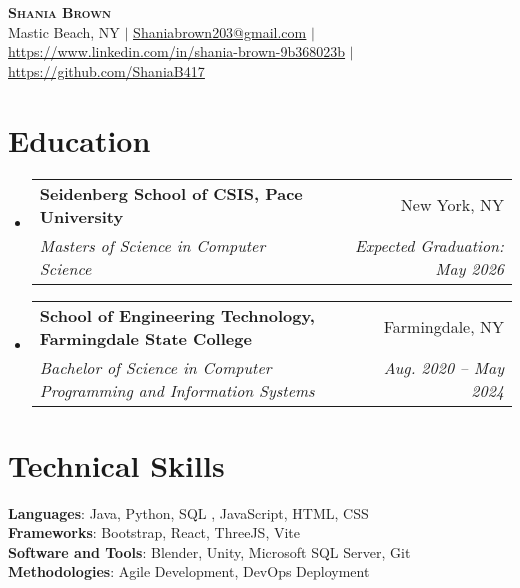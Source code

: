 \documentclass[letterpaper,11pt]{article}
\makeatletter
\newcommand{\resumeSubheading}[4]{
  \vspace{-2pt}\item
    \begin{tabular*}{0.97\textwidth}[t]{l@{\extracolsep{\fill}}r}
      \textbf{#1} & #2 \\
      \textit{\small#3} & \textit{\small #4} \\
    \end{tabular*}\vspace{-7pt}
}
\newcommand{\resumeSubHeadingListStart}{\begin{itemize}[leftmargin=0.15in, label={}]}
\newcommand{\resumeSubHeadingListEnd}{\end{itemize}}
\makeatother
\begin{document}

\begin{center}
    \textbf{\Huge \scshape Shania Brown} \\ \vspace{1pt}
    \small Mastic Beach, NY $|$ \href{mailto:Shaniabrown203@gmail.com}{\underline{Shaniabrown203@gmail.com}} $|$ 
    \href{https://linkedin.com/in/shania-brown-9b368023b}{\underline{https://www.linkedin.com/in/shania-brown-9b368023b}} $|$
    \href{https://github.com/ShaniaB417}{\underline{https://github.com/ShaniaB417}}
\end{center}


\section{Education}
  \resumeSubHeadingListStart
    \resumeSubheading
      {Seidenberg School of CSIS, Pace University}{New York, NY}
      {Masters of Science in Computer Science}{Expected Graduation: May 2026}
    \resumeSubheading
      {School of Engineering Technology, Farmingdale State College }{Farmingdale, NY}
      {Bachelor of Science in Computer Programming and Information Systems }{Aug. 2020 -- May 2024}
  \resumeSubHeadingListEnd



\section{Technical Skills}
 \begin{itemize}[leftmargin=0.15in, label={}]
    \small{\item{
     \textbf{Languages}{: Java, Python, SQL , JavaScript, HTML, CSS } \\
     \textbf{Frameworks}{: Bootstrap, React, ThreeJS, Vite } \\
     \textbf{Software and Tools}{: Blender, Unity, Microsoft SQL Server, Git } \\
     \textbf{Methodologies}{: Agile Development, DevOps Deployment}
    }}
 \end{itemize}
\end{document}
